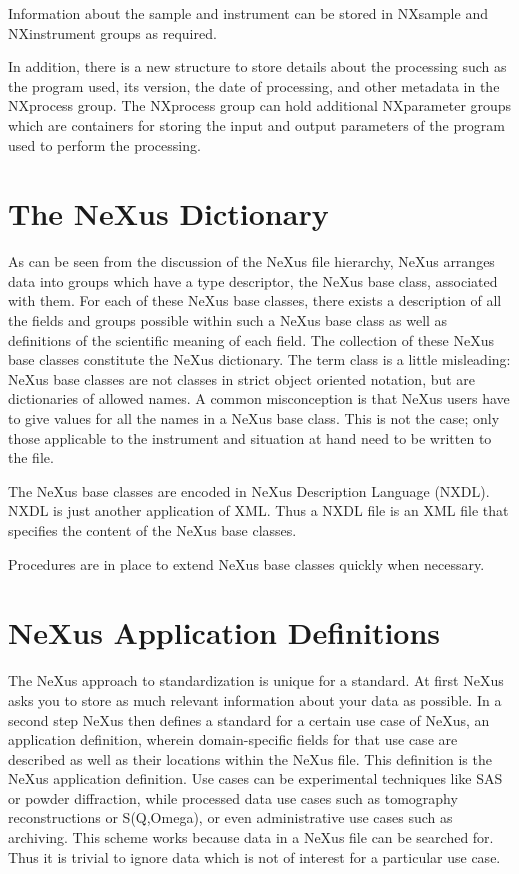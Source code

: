 \documentclass[%
 aip,
rsi,
 amsmath,amssymb,
 reprint,%
]{revtex4-1}
\begin{document}
Information about the sample and instrument can be stored in NXsample and NXinstrument groups as required. 

In addition, there is a new structure to store details about the processing such as the program used, its version, 
the date of processing, and other metadata 
in the NXprocess group. The NXprocess group can hold additional NXparameter groups which are containers 
for storing the input and output parameters of the program used to perform the processing. 


\section{The NeXus Dictionary}

As can be seen from the discussion of the NeXus file hierarchy, NeXus arranges data into groups which have a 
type descriptor, the NeXus base class, associated with them. For each of these NeXus base classes, there 
exists a description of all the fields and groups possible within such a NeXus base class as well as definitions 
of the scientific meaning of each field. The collection of these NeXus base classes constitute the NeXus dictionary. 
The term class is a little misleading: NeXus base classes are not classes in strict object oriented notation, but 
are dictionaries of allowed names. A common misconception is that NeXus users have to give values for all the 
names in a NeXus base class. This is not the case; only those applicable to the instrument and situation at hand need 
to be written to the file.

The NeXus base classes are encoded in NeXus Description Language (NXDL)\cite{nxman}. NXDL is 
just another application of XML. Thus a NXDL file is an XML file that specifies the content of the NeXus base classes. 

Procedures are in place to extend NeXus base classes quickly when necessary.


\section{NeXus Application Definitions}

The NeXus approach to standardization is unique for a standard. At first NeXus asks you to store 
as much relevant information about your data as possible. In a second step NeXus then defines a 
standard for a certain use case of NeXus, an application definition, wherein domain-specific fields 
for that use case are described as well as their locations within the NeXus file. This 
definition is the NeXus application definition. Use cases can be experimental techniques like SAS or 
powder diffraction, while processed data use cases such as tomography reconstructions or S(Q,Omega), 
or even administrative use cases such as archiving. This scheme works because data in a NeXus file 
can be searched for. Thus it is trivial to ignore data which is not of interest for a particular use case.
\end{document}

